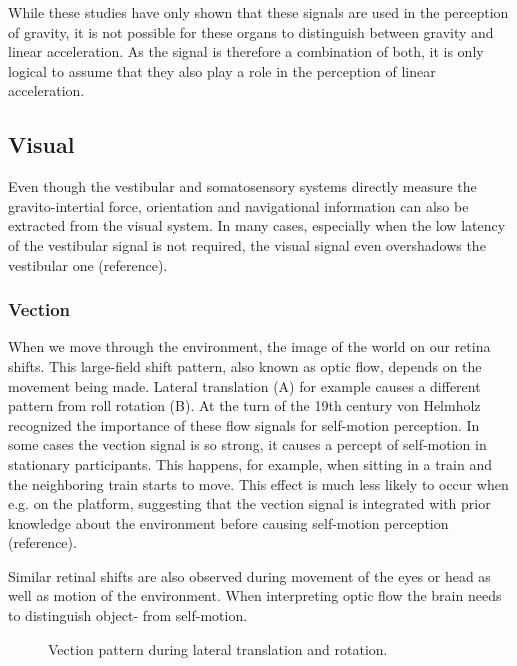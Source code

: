 While these studies have only shown that these signals are used in the perception of gravity, it is not possible for these organs to distinguish between gravity and linear acceleration. As the signal is therefore a combination of both, it is only logical to assume that they also play a role in the perception of linear acceleration.

\subsection{Visual}
Even though the vestibular and somatosensory systems directly measure the gravito-intertial force, orientation and navigational information can also be extracted from the visual system. In many cases, especially when the low latency of the vestibular signal is not required, the visual signal even overshadows the vestibular one (reference).

\subsubsection{Vection}
When we move through the environment, the image of the world on our retina shifts. This large-field shift pattern, also known as optic flow, depends on the movement being made. Lateral translation (A) for example causes a different pattern from roll rotation (B). At the turn of the 19th century von Helmholz \citeyear{vonhelmholz1910} recognized the importance of these flow signals for self-motion perception. In some cases the vection signal is so strong, it causes a percept of self-motion in stationary participants. This happens, for example, when sitting in a train and the neighboring train starts to move. This effect is much less likely to occur when e.g. on the platform, suggesting that the vection signal is integrated with prior knowledge about the environment before causing self-motion perception (reference).

Similar retinal shifts are also observed during movement of the eyes or head as well as motion of the environment. When interpreting optic flow the brain needs to distinguish object- from self-motion. 



\begin{figure}
    
    \caption{Vection pattern during  lateral translation and  rotation.}
    \label{intro:fig2}
\end{figure}


